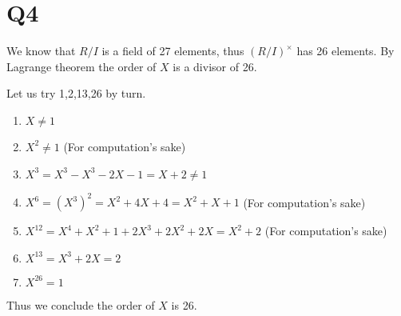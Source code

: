 \documentclass[12pt, a4paper]{article}
\theoremstyle{definition}
\theoremstyle{remark}
\begin{document}
\section{Q4}

We know that $R/I$ is a field of 27 elements, thus $(R/I)^{\times}$ has 26 elements.
By Lagrange theorem the order of $X$ is a divisor of 26.

Let us try 1,2,13,26 by turn.
\begin{enumerate}
	\item $X \neq 1$
	\item $X^2 \neq 1$ (For computation's sake)
	\item $X^3 = X^3 - X^3 -2X - 1 = X + 2 \neq 1$
	\item $X^6 = (X^3)^2 = X^2+4X+4 = X^2+X+1 $ (For computation's sake)
	\item $X^{12} = X^4 + X^2 + 1 + 2X^3+2X^2+2X = X^2+2$ (For computation's sake)
	\item $X^{13} = X^3 + 2X = 2$
	\item $X^{26} = 1$
\end{enumerate}
Thus we conclude the order of $X$ is 26.
\end{document}
